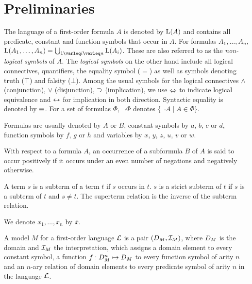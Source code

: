 \section{Preliminaries}
\label{sec:preliminaries}


The language of a first-order formula $A$ is denoted by $\operatorname{L}(A)$ and contains all predicate, constant and function symbols that occur in $A$.
For formulas $A_1, \ldots, A_n$, $\Lang(A_1, \ldots, A_n) = \bigcup_{1\varleq i \varleq n} \Lang(A_i)$.
These are also referred to as the \emph{\mbox{non-logical} symbols} of $A$.
The \emph{logical symbols} on the other hand include all logical connectives, quantifiers, the equality symbol ($=$) as well as symbols denoting truth ($\top$) and falsity ($\bot$).
Among the usual symbols for the logical connectives $\land$ (conjunction), $\lor$ (disjunction), $\operatorname{\supset}$ (implication), we use $\operatorname{\Leftrightarrow}$ to indicate logical equivalence and $\operatorname{\leftrightarrow}$ for implication in both direction.
Syntactic equality is denoted by $\equiv$.
For a set of formulas $\Phi$, $\lnot \Phi$ denotes $\{\lnot A \mid A \in \Phi\}$.

Formulas are usually denoted by $A$ or $B$, constant symbols by $a$, $b$, $c$ or $d$, function symbols by $f$, $g$ or $h$ and variables by $x$, $y$, $z$, $u$, $v$ or $w$.


With respect to a formula\nolinebreak{} $A$, an occurrence of a subformula $B$ of $A$ is said to occur positively if it occurs under an even number of negations and negatively otherwise.



A term $s$ is a subterm of a term $t$ if $s$ occurs in $t$. $s$ is a strict subterm of $t$ if $s$ is a subterm of $t$ and $s \neq t$. The superterm relation is the inverse of the subterm relation.


We denote $x_1, \ldots, x_n$ by $\bar x$.


A model $M$ for a first-order language $\operatorname{\mathcal{L}}$ is a pair $(D_{M}, \mathcal{I}_{M})$, where $D_{M}$ is the domain and $\mathcal{I}_{M}$ the interpretation, which assigns a domain element to every constant symbol, a function $f : D_{M}^n \mapsto D_{M}$ to every function symbol of arity $n$ and an $n$-ary relation of domain elements to every predicate symbol of arity $n$ in the language $\operatorname{\mathcal{L}}$.

